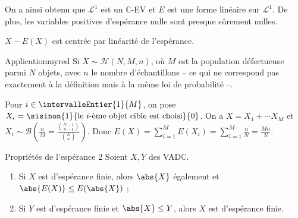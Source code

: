     On a ainsi obtenu que $\mathcal{L}^1$ est un $\mathbb{C}$-EV et $E$ est une forme linéaire sur $\mathcal{L}^1$. De plus, les variables positives d’espérance nulle sont presque sûrement nulles. 

    $X - E(X)$ est centrée par linéarité de l’espérance.

    \begin{omed}{Application}{myred}
        Si $X \sim \mathcal{H}(N,M,n)$, où $M$ est la population défectueuse parmi $N$ objets, avec $n$ le nombre d’échantillons -- ce qui ne correspond pas exactement à la définition mais à la même loi de probabilité --. 

        Pour $i \in \intervalleEntier{1}{M}$, on pose $X_i = \sisinon{1}{\text{le } i\text{-ème objet cible est choisi}}{0}$. On a $X = X_1 + \cdots X_M$ et $X_i \sim \mathcal{B}(\frac{n}{M} = \frac{\binom{N-1}{n-1}}{\binom{N}{n}})$. Donc $E(X) = \sum_{i = 1}^M E(X_i) = \sum_{i = 1}^M \frac{n}{N} = \frac{Mn}{N}$. 
    \end{omed}

    \begin{theo}{Propriétés de l’espérance 2}{}
        Soient $X,Y$ des VAD$\mathbb{C}$. 
        \begin{enumerate}
            \item Si $X$ est d’espérance finie, alors $\abs{X}$ également et $\abs{E(X)} \leq E(\abs{X})$ ;
            \item Si $Y$ est d’espérance finie et $\abs{X} \leq Y$, alors $X$ est d’espérance finie.
        \end{enumerate}
    \end{theo}

